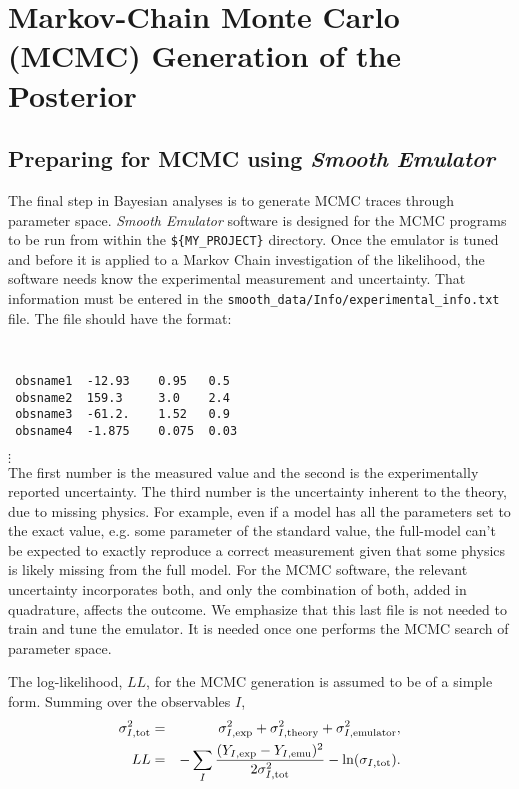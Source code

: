 \documentclass[UserManual.tex]{subfiles}
\begin{document}
\setcounter{section}{6}
\section{Markov-Chain Monte Carlo (MCMC) Generation of the Posterior}\label{sec:mcmc}

\subsection{Preparing for MCMC using {\it Smooth Emulator}}

The final step in Bayesian analyses is to generate MCMC traces through parameter space. {\it Smooth Emulator} software is designed for the MCMC programs to be run from within the {\tt \$\{MY\_PROJECT\}} directory. Once the emulator is tuned and before it is applied to a Markov Chain investigation of the likelihood, the software needs know the experimental measurement and uncertainty. That information must be entered in the {\tt smooth\_data/Info/experimental\_info.txt} file. The file should have the format:
{\tt
\begin{verbatim}
 obsname1  -12.93    0.95   0.5
 obsname2  159.3     3.0    2.4
 obsname3  -61.2.    1.52   0.9
 obsname4  -1.875    0.075  0.03
\end{verbatim}}
\vspace*{-16pt}
 \hspace*{28pt}$\vdots$\\
The first number is the measured value and the second is the experimentally reported uncertainty. The third number is the uncertainty inherent to the theory, due to missing physics. For example, even if a model has all the parameters set to the exact value, e.g. some parameter of the standard value, the full-model can't be expected to exactly reproduce a correct measurement given that some physics is likely missing from the full model. For the MCMC software, the relevant uncertainty incorporates both, and only the combination of both, added in quadrature, affects the outcome. We emphasize that this last file is not needed to train and tune the emulator. It is needed once one performs the MCMC search of parameter space.

The log-likelihood, $LL$, for the MCMC generation is assumed to be of a simple form. Summing over the observables $I$,
\begin{eqnarray*}
\sigma_{I,{\rm tot}}^{2}&=&\sigma_{I,{\rm exp}}^2+\sigma_{I,{\rm theory}}^2+\sigma_{I,{\rm emulator}}^2,\\
LL&=&-\sum_{I}\frac{(Y_{I,{\rm exp}}-Y_{I,{\rm emu}})^{2}}{2\sigma_{I,{\rm tot}}^{2}}-\ln(\sigma_{I,{\rm tot}}).
\end{eqnarray*}
\end{document}
